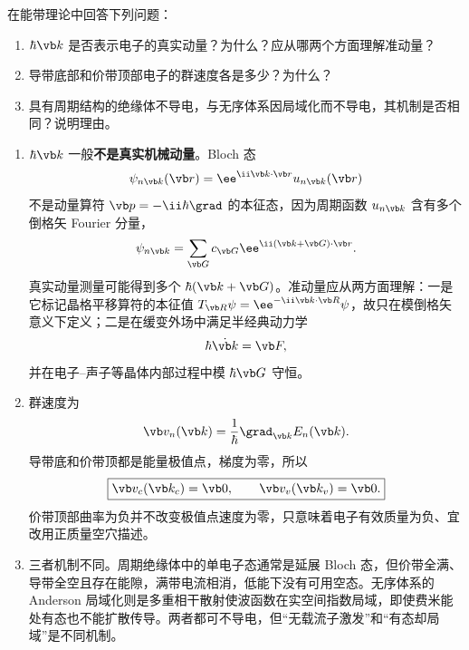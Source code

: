 
\begin{question}[10 分]
在能带理论中回答下列问题：
\begin{enumerate}
  \item $\hbar\vb k$ 是否表示电子的真实动量？为什么？应从哪两个方面理解准动量？
  \item 导带底部和价带顶部电子的群速度各是多少？为什么？
  \item 具有周期结构的绝缘体不导电，与无序体系因局域化而不导电，其机制是否相同？说明理由。
\end{enumerate}


\begin{solution}
\begin{enumerate}
  \item $\hbar\vb k$ 一般\textbf{不是真实机械动量}。Bloch 态
  \[
    \psi_{n\vb k}(\vb r)=\ee^{\ii\vb k\cdot\vb r}u_{n\vb k}(\vb r)
  \]
  不是动量算符 $\vb p=-\ii\hbar\grad$ 的本征态，因为周期函数 $u_{n\vb k}$ 含有多个倒格矢 Fourier 分量，
  \[
    \psi_{n\vb k}=\sum_{\vb G}c_{\vb G}\ee^{\ii(\vb k+\vb G)\cdot\vb r}.
  \]
  真实动量测量可能得到多个 $\hbar(\vb k+\vb G)$。准动量应从两方面理解：一是它标记晶格平移算符的本征值
  $T_{\vb R}\psi=\ee^{-\ii\vb k\cdot\vb R}\psi$，故只在模倒格矢意义下定义；二是在缓变外场中满足半经典动力学
  \[
    \hbar\dot{\vb k}=\vb F,
  \]
  并在电子--声子等晶体内部过程中模 $\hbar\vb G$ 守恒。
  \item 群速度为
  \[
    \vb v_n(\vb k)=\frac1\hbar\grad_{\vb k}E_n(\vb k).
  \]
  导带底和价带顶都是能量极值点，梯度为零，所以
  \[
    \boxed{\vb v_c(\vb k_c)=\vb0,
    \qquad \vb v_v(\vb k_v)=\vb0.}
  \]
  价带顶部曲率为负并不改变极值点速度为零，只意味着电子有效质量为负、宜改用正质量空穴描述。
  \item 三者机制不同。周期绝缘体中的单电子态通常是延展 Bloch 态，但价带全满、导带全空且存在能隙，满带电流相消，低能下没有可用空态。无序体系的 Anderson 局域化则是多重相干散射使波函数在实空间指数局域，即使费米能处有态也不能扩散传导。两者都可不导电，但“无载流子激发”和“有态却局域”是不同机制。
\end{enumerate}
\end{solution}
\end{question}

